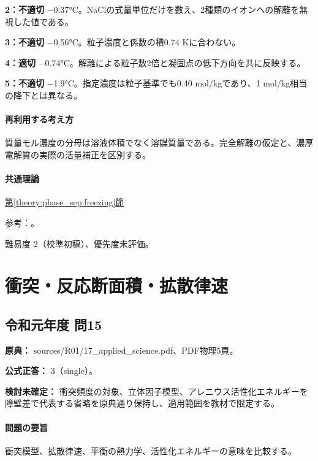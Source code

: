 \noindent\textbf{2：不適切} −0.37°C。NaClの式量単位だけを数え、2種類のイオンへの解離を無視した値である。\par

\noindent\textbf{3：不適切} −0.56°C。粒子濃度と係数の積0.74 Kに合わない。\par

\noindent\textbf{4：適切} −0.74°C。解離による粒子数2倍と凝固点の低下方向を共に反映する。\par

\noindent\textbf{5：不適切} −1.9°C。指定濃度は粒子基準でも0.40 mol/kgであり、1 mol/kg相当の降下とは異なる。\par

\paragraph{再利用する考え方} 質量モル濃度の分母は溶液体積でなく溶媒質量である。完全解離の仮定と、濃厚電解質の実際の活量補正を区別する。

\paragraph{共通理論} \hyperref[theory:phase_sep:freezing]{第\ref*{theory:phase_sep:freezing}節}

\par 参考：\cite{mit_colligative2008}。

\par 難易度 2（校準初稿）、優先度未評価。

\section{衝突・反応断面積・拡散律速}

\subsection{令和元年度 問15}
\label{q:r01-reg-applied-15}

\noindent\textbf{原典：} sources/R01/17\_applied\_science.pdf、PDF物理5頁。

\textbf{公式正答：} 3（single）。

\par\textbf{検討未確定：} 衝突頻度の対象、立体因子模型、アレニウス活性化エネルギーを障壁差で代表する省略を原典通り保持し、適用範囲を教材で限定する。

\paragraph{問題の要旨} 衝突模型、拡散律速、平衡の熱力学、活性化エネルギーの意味を比較する。

